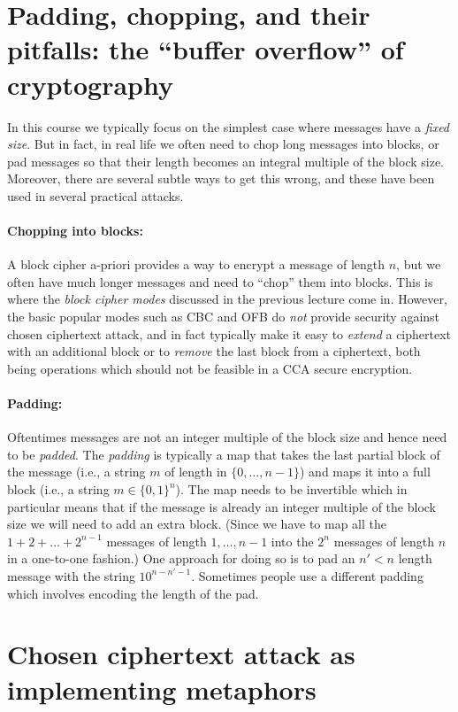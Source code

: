 \section{Padding, chopping, and their pitfalls: the ``buffer overflow''
of cryptography}\label{6-Padding-chopping-and-t}

In this course we typically focus on the simplest case where messages
have a \emph{fixed size}. But in fact, in real life we often need to
chop long messages into blocks, or pad messages so that their length
becomes an integral multiple of the block size. Moreover, there are
several subtle ways to get this wrong, and these have been used in
several practical attacks.

\paragraph{Chopping into blocks:} A block cipher a-priori provides a way
to encrypt a message of length \(n\), but we often have much longer
messages and need to ``chop'' them into blocks. This is where the
\emph{block cipher modes} discussed in the previous lecture come in.
However, the basic popular modes such as CBC and OFB do \emph{not}
provide security against chosen ciphertext attack, and in fact typically
make it easy to \emph{extend} a ciphertext with an additional block or
to \emph{remove} the last block from a ciphertext, both being operations
which should not be feasible in a CCA secure encryption.

\paragraph{Padding:} Oftentimes messages are not an integer multiple of
the block size and hence need to be \emph{padded}. The \emph{padding} is
typically a map that takes the last partial block of the message (i.e.,
a string \(m\) of length in \(\{0,\ldots,n-1\}\)) and maps it into a
full block (i.e., a string \(m\in\{0,1\}^n\)). The map needs to be
invertible which in particular means that if the message is already an
integer multiple of the block size we will need to add an extra block.
(Since we have to map all the \(1+2+\ldots+2^{n-1}\) messages of length
\(1,\ldots,n-1\) into the \(2^n\) messages of length \(n\) in a
one-to-one fashion.) One approach for doing so is to pad an \(n'<n\)
length message with the string \(10^{n-n'-1}\). Sometimes people use a
different padding which involves encoding the length of the pad.

\section{Chosen ciphertext attack as implementing
metaphors}\label{6-Chosen-ciphertext-atta}

